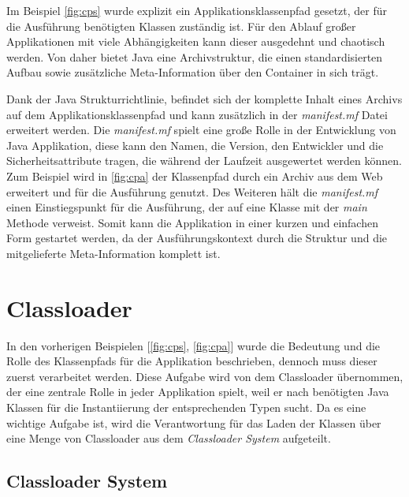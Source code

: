   Im Beispiel \ref{fig:cps} wurde explizit ein Applikationsklassenpfad gesetzt, der für die Ausführung benötigten Klassen zuständig ist. Für den Ablauf großer Applikationen mit viele Abhängigkeiten kann dieser ausgedehnt und chaotisch werden. Von daher bietet Java eine Archivstruktur, die einen standardisierten Aufbau sowie zusätzliche Meta-Information über den Container in sich trägt. 
  
  Dank der Java Strukturrichtlinie, befindet sich der komplette Inhalt eines Archivs auf dem Applikationsklassenpfad und kann zusätzlich in der \textit{manifest.mf} Datei erweitert werden. Die \textit{manifest.mf} spielt eine große Rolle in der Entwicklung von Java Applikation, diese kann den Namen, die Version, den Entwickler und die Sicherheitsattribute tragen, die während der Laufzeit ausgewertet werden können. Zum Beispiel wird in \ref{fig:cpa} der Klassenpfad durch ein Archiv aus dem Web erweitert und für die Ausführung genutzt. Des Weiteren hält die \textit{manifest.mf} einen Einstiegspunkt für die Ausführung, der auf eine Klasse mit der \textit{main} Methode verweist.\newline
  Somit kann die Applikation in einer kurzen und einfachen Form gestartet werden, da der Ausführungskontext durch die Struktur und die mitgelieferte Meta-Information komplett ist. \cite{classLoadingOracle}


\section{Classloader}\label{sec:cl}

  In den vorherigen Beispielen [\ref{fig:cps}, \ref{fig:cpa}] wurde die Bedeutung und die Rolle des Klassenpfads für die Applikation beschrieben, dennoch muss dieser zuerst verarbeitet werden. Diese Aufgabe wird von dem Classloader übernommen, der eine zentrale Rolle in jeder Applikation spielt, weil er nach benötigten Java Klassen für die Instantiierung der entsprechenden Typen sucht. Da es eine wichtige Aufgabe ist, wird die Verantwortung für das Laden der Klassen über eine Menge von Classloader aus dem \textit{Classloader System} aufgeteilt. 


  \subsection{Classloader System} \label{sec:cls}

